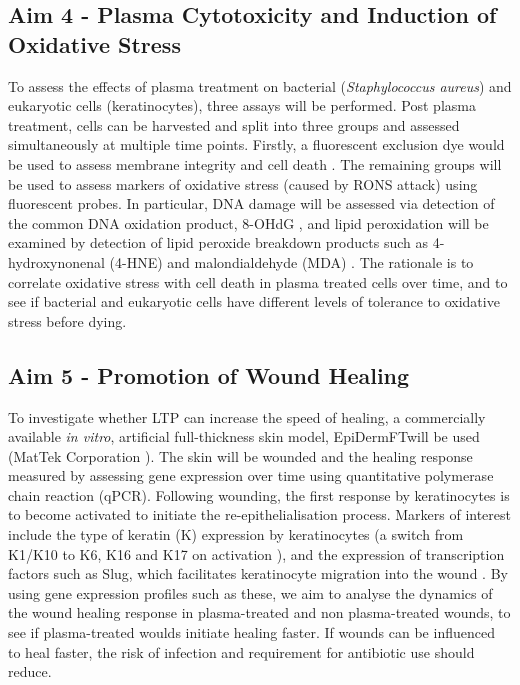 \documentclass[11pt, oneside]{article}   	%
\begin{document}
\subsection*{Aim 4 - Plasma Cytotoxicity and Induction of Oxidative Stress}
To assess the effects of plasma treatment on bacterial (\textit{Staphylococcus aureus}) and eukaryotic cells (keratinocytes), three assays will be performed.
Post plasma treatment, cells can be harvested and split into three groups and assessed simultaneously at multiple time points.
Firstly, a fluorescent exclusion dye would be used to assess membrane integrity and cell death \cite{Kepp2011cell}.
The remaining groups will be used to assess markers of oxidative stress (caused by RONS attack) using fluorescent probes. 
In particular, DNA damage will be assessed via detection of the common DNA oxidation product, 8-OHdG \cite{Valavanidis20098, Dizdaroglu2012oxidatively}, and lipid peroxidation will be examined by detection of lipid peroxide breakdown products such as 4-hydroxynonenal (4-HNE) and malondialdehyde (MDA) \cite{Ayala2014lipid, Joshi2010control, Joshi2011nonthermal}.
The rationale is to correlate oxidative stress with cell death in plasma treated cells over time, and to see if bacterial and eukaryotic cells have different levels of tolerance to oxidative stress before dying.



\subsection*{Aim 5 - Promotion of Wound Healing}
To investigate whether LTP can increase the speed of healing, a commercially available \textit{in vitro}, artificial full-thickness skin model, EpiDermFT\texttrademark will be used (MatTek Corporation \cite{MattekWebsite}). 
The skin will be wounded and the healing response measured by assessing gene expression over time using quantitative polymerase chain reaction (qPCR).
Following wounding, the first response by keratinocytes is to become activated to initiate the re-epithelialisation process. 
Markers of interest include the type of keratin (K) expression by keratinocytes (a switch from K1/K10 to K6, K16 and K17 on activation \cite{Pastar2014epithelialization}), and the expression of transcription factors such as Slug, which facilitates keratinocyte migration into the wound \cite{Savagner2005}.
By using gene expression profiles such as these, we aim to analyse the dynamics of the wound healing response in plasma-treated and non plasma-treated wounds, to see if plasma-treated woulds initiate healing faster.
If wounds can be influenced to heal faster, the risk of infection and requirement for antibiotic use should reduce.
\end{document}
